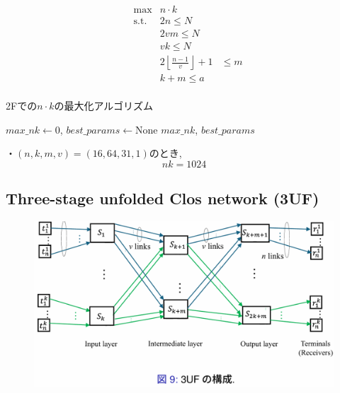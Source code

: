 \documentclass[11pt, a4paper]{jarticle}
\begin{document}
\begin{align}
    & \max  &n \cdot k \\
    & \text{s.t.} & 2n \leq N \\
    && 2 v m \leq N\\
    && v k \leq N \\
    && 2 \left\lfloor \frac{n-1}{v} \right\rfloor + 1 &\leq m \\
    && k + m \leq a\\
\end{align}

\begin{algorithm}[H]
    \caption{2Fでの$n \cdot k$の最大化アルゴリズム}
    $max\_nk \gets 0$, $best\_params \gets \text{None}$\;
    \Return $max\_nk$, $best\_params$\;
\end{algorithm}

・$(n, k, m, v) = (16, 64, 31, 1)$のとき, $$nk=1024$$

\subsection{Three-stage unfolded Clos network (3UF)}

\begin{figure}[H]
    \centering
    \includegraphics[width=0.5\linewidth]{3uf.png}
\end{figure}
\end{document}
